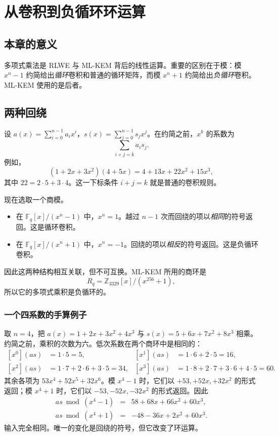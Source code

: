 \chapter{从卷积到负循环环运算}
\label{ch:convolution}

\section{本章的意义}

多项式乘法是 RLWE 与 ML-KEM 背后的线性运算。重要的区别在于模：模 $x^n-1$ 约简给出\emph{循环}卷积和普通的循环矩阵，而模 $x^n+1$ 约简给出\emph{负循环}卷积。ML-KEM 使用的是后者。

\section{两种回绕}

设 $a(x)=\sum_{i=0}^{n-1}a_i x^i$，$s(x)=\sum_{j=0}^{n-1}s_j x^j$。在约简之前，$x^k$ 的系数为
\[
  \sum_{i+j=k} a_i s_j.
\]
例如，
\[
(1+2x+3x^2)(4+5x)=4+13x+22x^2+15x^3,
\]
其中 $22=2\cdot5+3\cdot4$。这一下标条件 $i+j=k$ 就是普通的卷积规则。

现在选取一个商模。
\begin{itemize}
  \item 在 $\mathbb{F}_q[x]/(x^n-1)$ 中，$x^n=1$。越过 $n-1$ 次而回绕的项以\emph{相同}的符号返回。这是循环卷积。
  \item 在 $\mathbb{F}_q[x]/(x^n+1)$ 中，$x^n=-1$。回绕的项以\emph{相反}的符号返回。这是负循环卷积。
\end{itemize}

因此这两种结构相互关联，但不可互换。ML-KEM 所用的商环是
\[
 R_q=\mathbb{Z}_{3329}[x]/(x^{256}+1),
\]
所以它的多项式乘积是负循环的。

\subsection{一个四系数的手算例子}

取 $n=4$，把 $a(x)=1+2x+3x^2+4x^3$ 与 $s(x)=5+6x+7x^2+8x^3$ 相乘。约简之前，乘积的次数为六。低次系数在两个商环中是相同的：
\[
\begin{aligned}
[x^0](as)&=1\cdot5=5, & [x^1](as)&=1\cdot6+2\cdot5=16,\\
[x^2](as)&=1\cdot7+2\cdot6+3\cdot5=34, & [x^3](as)&=1\cdot8+2\cdot7+3\cdot6+4\cdot5=60.
\end{aligned}
\]
其余各项为 $53x^4+52x^5+32x^6$。模 $x^4-1$ 时，它们以 $+53,+52x,+32x^2$ 的形式返回；模 $x^4+1$ 时，它们以 $-53,-52x,-32x^2$ 的形式返回。因此
\[
\begin{array}{rcl}
as\bmod(x^4-1)&=&58+68x+66x^2+60x^3,\\
as\bmod(x^4+1)&=&-48-36x+2x^2+60x^3.
\end{array}
\]
输入完全相同。唯一的变化是回绕的符号，但它改变了环运算。

